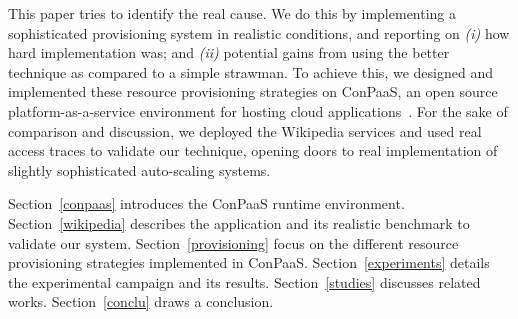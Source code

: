 This paper tries to identify the real cause. We do this by implementing a sophisticated provisioning system in realistic conditions, and reporting on \emph{(i)} how hard implementation was; and \emph{(ii)} potential gains from using the better technique as compared to a simple strawman. To achieve this, we designed and implemented these resource provisioning strategies on ConPaaS, an open source platform-as-a-service environment for hosting cloud applications~\cite{conpaasIC}. For the sake of comparison and discussion, we deployed the Wikipedia services and used real access traces to validate our technique, opening doors to real implementation of slightly sophisticated auto-scaling systems.


Section~\ref{conpaas} introduces the ConPaaS runtime environment. Section~\ref{wikipedia} describes the application and its realistic benchmark to validate our system. Section~\ref{provisioning} focus on the different resource provisioning strategies implemented in ConPaaS. Section~\ref{experiments} details the experimental campaign and its results. Section~\ref{studies} discusses related works. Section~\ref{conclu} draws a conclusion.

